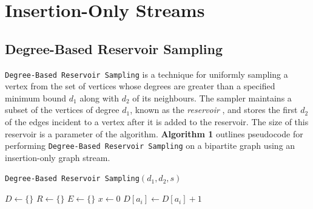 \documentclass[11pt,twoside,a4paper]{report}
\begin{document}
\chapter{Insertion-Only Streams}

\section{Degree-Based Reservoir Sampling}

\texttt{Degree-Based Reservoir Sampling} is a technique for uniformly sampling a vertex from the set of vertices whose degrees are greater than a specified minimum bound $d_1$ along with $d_2$ of its neighbours. The sampler maintains a subset of the vertices of degree $d_1$, known as the \textit{reservoir} \cite{degResSampling}, and stores the first $d_2$ of the edges incident to a vertex after it is added to the reservoir. The size of this reservoir is a parameter of the algorithm. \textbf{Algorithm 1} outlines pseudocode for performing \texttt{Degree-Based Reservoir Sampling} on a bipartite graph using an insertion-only graph stream.

\begin{algorithm}[H]
	\caption{\texttt{Degree-Based Reservoir Sampling}$(d_1,d_2,s)$}
	$D\leftarrow\{\}$ 
	$R\leftarrow\{\}$ 
	$E\leftarrow\{\}$ 
	$x\leftarrow0$
	 {
		$D[a_i]\leftarrow D[a_i]+1$
	}
	 {
	} 
\end{algorithm}
\end{document}
